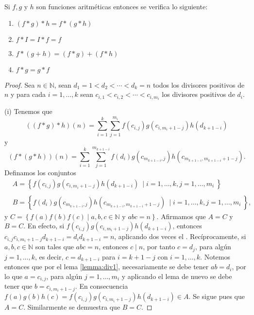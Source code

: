 \begin{proposition}
Si $f,g$ y $h$ son funciones aritméticas entonces se verifica lo siguiente:

\begin{enumerate}[label=\textnormal{(\roman*)}]
	\item $(f*g)*h=f*(g*h)$
	\item $f*I=I*f=f$
	\item $f*(g+h)=(f*g)+(f*h)$
	\item $f*g=g*f$
\end{enumerate}
\end{proposition}
\begin{proof}
Sea $n\in\mathbb{N}$, sean $d_1=1<d_2<\cdots<d_k=n$ todos los divisores positivos de $n$ y para cada $i=1,\ldots,k$ sean $c_{i,1}<c_{i,2}<\cdots<c_{i,m_i}$ los divisores positivos de $d_i$.
\bigskip

(i) Tenemos que 
\begin{equation}\label{eqn:sum1}
	((f*g)*h)(n)=\sum_{i=1}^{k} \sum_{j=1}^{m_i} f(c_{i,j})g(c_{i,m_i+1-j})h(d_{k+1-i})
\end{equation}
y 
\begin{equation}\label{eqn:sum2}
	(f*(g*h))(n)=\sum_{i=1}^{k} \sum_{j=1}^{m_{k+1-i}} f(d_i)g(c_{m_{k+1-i},j})h(c_{m_{k+1-i},m_{k+1-i}+1-j}).
\end{equation}
Definamos los conjuntos 
\begin{align*}
	& A=\left\{f(c_{i,j})g(c_{i,m_i+1-j})h(d_{k+1-i}) \: \mid i=1,\ldots,k,j=1,\ldots,m_i \: \right\} \\
	& \\
	& B=\left\{f(d_i)g(c_{m_{k+1-i},j})h(c_{m_{k+1-i},m_{k+1-i}+1-j}) \: \mid i=1,\ldots,k,j=1,\ldots,m_i \: \right\},
\end{align*}
y $C=\left\{f(a)f(b)f(c) \mid a,b,c\in\mathbb{N} \textrm{ y } a b c=n\right\}$. Afirmamos que $A=C$ y $B=C$. En efecto, si $f(c_{i,j})g(c_{i,m_i+1-j})h(d_{k+1-i})$, entonces $c_{i,j}c_{i,m_i+1-j}d_{k+1-i}=d_i d_{k+1-i}=n$, aplicando dos veces el . Recíprocamente, si $a,b,c\in\mathbb{N}$ son tales que $a b c = n$, entonces $c \mid n$, por tanto $c=d_j$, para algún $j=1,\ldots,k$, es decir, $c=d_{k+1-i}$ para $i=k+1-j$ con $i=1,\ldots,k$. Notemos entonces que por el lema \ref{lemma:div1}, necesariamente se debe tener $a b=d_i$, por lo que $a=c_{i,j}$, para algún $j=1,\ldots,m_i$ y aplicando el lema de nuevo se debe tener que $b=c_{i,m_i+1-j}$. En consecuencia $f(a)g(b)h(c)=f(c_{i,j})g(c_{i,m_i+1-j})h(d_{k+1-i})\in A$. Se sigue pues que $A=C$. Similarmente se demuestra que $B=C$.
\bigskip


\end{proof}
